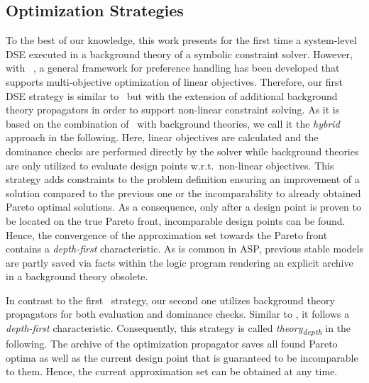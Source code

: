 \subsection{Optimization Strategies}
To the best of our knowledge, this work presents for the first time a system-level \ac{DSE} executed in a background theory of a symbolic constraint solver. However, with \asprin\ \cite{Brewka2015}, a general framework for preference handling has been developed that supports multi-objective optimization of linear objectives. Therefore, our first \ac{DSE} strategy is similar to \asprin\ but with the extension of additional background theory propagators in order to support non-linear constraint solving. %
As it is based on the combination of \asprin\ with background theories, we call it the \emph{hybrid} approach in the following. Here, linear objectives are calculated and the dominance checks are performed directly by the solver while background theories are only utilized to evaluate design points w.r.t.~non-linear objectives. This strategy adds constraints to the problem definition ensuring an improvement of a solution compared to the previous one or the incomparability to already obtained Pareto optimal solutions. As a consequence, only after a design point is proven to be located on the true Pareto front, incomparable design points can be found. Hence, the convergence of the approximation set towards the Pareto front contains a \emph{depth-first} characteristic. As is common in \ac{ASP}, previous stable models are partly saved via facts within the logic program rendering an explicit archive in a background theory obsolete. \par
In contrast to the first \hybrid\ strategy, our second one utilizes background theory propagators for both evaluation and dominance checks. Similar to \hybrid, it follows a \emph{depth-first} characteristic. Consequently, this strategy is called \emph{theory\textsubscript{depth}} in the following. The archive of the optimization propagator saves all found Pareto optima as well as the current design point that is guaranteed to be incomparable to them. Hence, the current approximation set can be obtained at any time. \par

